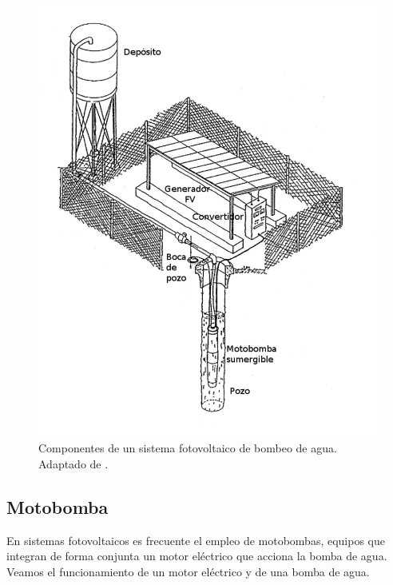 %
\begin{figure}
\begin{centering}
\includegraphics[scale=0.5]{../figs/EsquemaBombeo_oscar}
\end{centering}

\caption[Componentes de un sistema fotovoltaico de bombeo de agua.]{\label{fig:ComponentesSFB} Componentes de un sistema fotovoltaico
de bombeo de agua. Adaptado de \citep{Lorenzo.Narvarte2006}.}

\end{figure}



\subsection{Motobomba}

En sistemas fotovoltaicos es frecuente el empleo de motobombas, equipos
que integran de forma conjunta un motor eléctrico que acciona la bomba
de agua. Veamos el funcionamiento de un motor eléctrico y de una bomba
de agua. 


